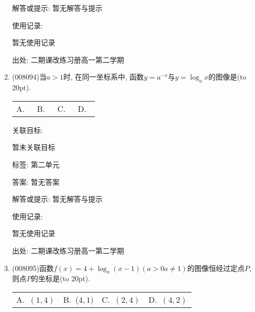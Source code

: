 \documentclass[10pt,a4paper]{article}
\newcommand{\bracket}[1]{(\hbox to #1pt{})}
\newcommand{\fourch}[4]{\par\begin{tabular}{p{.23\textwidth}p{.23\textwidth}p{.23\textwidth}p{.23\textwidth}}
A.~#1 &B.~#2& C.~#3& D.~#4
\end{tabular}}
\begin{document}
\begin{enumerate}[1.]
解答或提示: 暂无解答与提示

使用记录:

暂无使用记录


出处: 二期课改练习册高一第二学期
\item { (008094)}当$a>1$时, 在同一坐标系中, 函数$y=a^{-x}$与$y=\log _ax$的图像是\bracket{20}.
\fourch{\begin{tikzpicture}[scale = 0.7, >=latex]
    \draw [->] (-2,0) -- (2,0) node [below] {$x$};
    \draw [->] (0,-2) -- (0,2) node [left] {$y$};
    \draw (0,0) node [below left] {$O$};
    \draw [domain = -1:2] plot (\x, {pow(0.5,\x)});
    \draw [domain = -1:2] plot ({pow(0.5,\x)},-\x);
\end{tikzpicture}}
{\begin{tikzpicture}[scale = 0.7, >=latex]
    \draw [->] (-2,0) -- (2,0) node [below] {$x$};
    \draw [->] (0,-2) -- (0,2) node [left] {$y$};
    \draw (0,0) node [below left] {$O$};
    \draw [domain = -1:2] plot (-\x, {pow(0.5,\x)});
    \draw [domain = -1:2] plot ({pow(0.5,\x)},-\x);
\end{tikzpicture}}{\begin{tikzpicture}[scale = 0.7, >=latex]
    \draw [->] (-2,0) -- (2,0) node [below] {$x$};
    \draw [->] (0,-2) -- (0,2) node [left] {$y$};
    \draw (0,0) node [below left] {$O$};
    \draw [domain = -1:2] plot (-\x, {pow(0.5,\x)});
    \draw [domain = -1:2] plot ({pow(0.5,\x)},\x);
\end{tikzpicture}}{\begin{tikzpicture}[scale = 0.7, >=latex]
    \draw [->] (-2,0) -- (2,0) node [below] {$x$};
    \draw [->] (0,-2) -- (0,2) node [left] {$y$};
    \draw (0,0) node [below left] {$O$};
    \draw [domain = -1:2] plot (\x, {pow(0.5,\x)});
    \draw [domain = -1:2] plot ({pow(0.5,\x)},\x);
\end{tikzpicture}}


关联目标:

暂未关联目标



标签: 第二单元

答案: 暂无答案

解答或提示: 暂无解答与提示

使用记录:

暂无使用记录


出处: 二期课改练习册高一第二学期
\item { (008095)}函数$f(x)=4+\log _a(x-1)(a>0a\ne 1)$的图像恒经过定点$P$, 则点$P$的坐标是\bracket{20}.
\fourch{$(1, 4)$}{($4, 1)$}{$(2, 4)$}{$(4, 2)$}



\end{enumerate}
\end{document}
